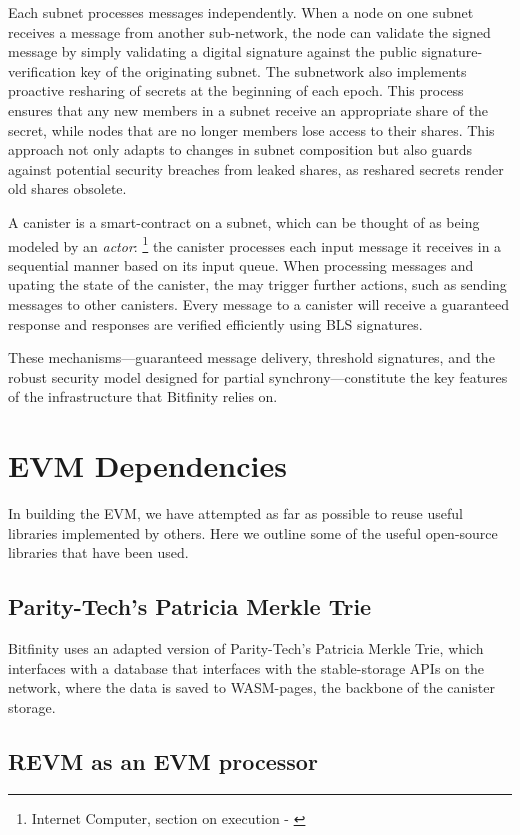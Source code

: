 \documentclass{article}
\begin{document}
 Each subnet processes messages independently. When a node on one subnet receives a message from another sub-network, the node can validate the signed message by simply validating a digital signature against the public signature-verification key of the originating subnet. The subnetwork  also implements  proactive resharing of secrets at the beginning of each epoch. This process ensures that any new members in a subnet receive an appropriate share of the secret, while nodes that are no longer members lose access to their shares. This approach not only adapts to changes in subnet composition but also guards against potential security breaches from leaked shares, as reshared secrets render old shares obsolete.

A canister is a smart-contract on a subnet, which can be thought of as being modeled by an \textit{actor}: \footnote{Internet Computer, section on execution - \cite{icpgeeks}} the canister processes each input message it receives in a sequential manner based on its input queue. When processing messages and upating the state of the canister, the may trigger further actions, such as sending messages to other canisters. Every message to a canister will receive a guaranteed response and responses are verified efficiently using BLS signatures.

These mechanisms—guaranteed message delivery, threshold signatures, and the robust security model designed for partial synchrony—constitute the key features of the infrastructure that Bitfinity relies on.

\section{EVM Dependencies} 

In building the EVM, we have attempted as far as possible to reuse useful libraries implemented by others. Here we outline some of the useful open-source libraries that have been used. 

\subsection{Parity-Tech's Patricia Merkle Trie}
Bitfinity uses an adapted version of Parity-Tech's Patricia Merkle Trie, which interfaces with a database that interfaces with the stable-storage APIs on the network, where the data is saved to WASM-pages, the backbone of the canister storage.  

\subsection{REVM as an EVM processor} \label{sssec:revm-processor}
\end{document}
